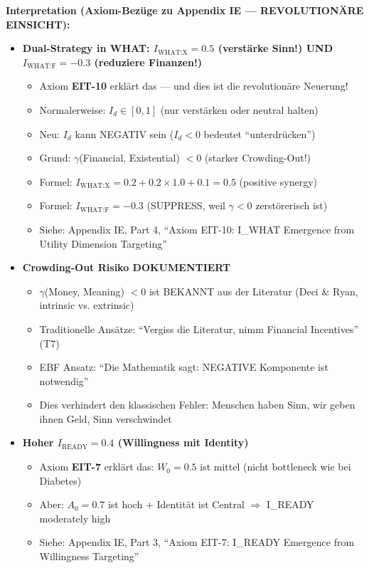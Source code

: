 \textbf{Interpretation (Axiom-Bezüge zu Appendix IE — REVOLUTIONÄRE EINSICHT):}
\begin{itemize}[nosep]
\item \textbf{Dual-Strategy in WHAT: $I_{\text{WHAT:X}} = 0.5$ (verstärke Sinn!) UND $I_{\text{WHAT:F}} = -0.3$ (reduziere Finanzen!)}
  \begin{itemize}[nosep]
  \item Axiom \textbf{EIT-10} erklärt das --- und dies ist die revolutionäre Neuerung!
  \item Normalerweise: $I_d \in [0, 1]$ (nur verstärken oder neutral halten)
  \item Neu: $I_d$ kann NEGATIV sein ($I_d < 0$ bedeutet ``unterdrücken'')
  \item Grund: $\gamma$(Financial, Existential) $< 0$ (starker Crowding-Out!)
  \item Formel: $I_{\text{WHAT:X}} = 0.2 + 0.2 \times 1.0 + 0.1 = 0.5$ (positive synergy)
  \item Formel: $I_{\text{WHAT:F}} = -0.3$ (SUPPRESS, weil $\gamma < 0$ zerstörerisch ist)
  \item Siehe: Appendix IE, Part 4, ``Axiom EIT-10: I_WHAT Emergence from Utility Dimension Targeting''
  \end{itemize}

\item \textbf{Crowding-Out Risiko DOKUMENTIERT}
  \begin{itemize}[nosep]
  \item $\gamma$(Money, Meaning) $< 0$ ist BEKANNT aus der Literatur (Deci \& Ryan, intrinsic vs. extrinsic)
  \item Traditionelle Ansätze: ``Vergiss die Literatur, nimm Financial Incentives'' (T7)
  \item EBF Ansatz: ``Die Mathematik sagt: NEGATIVE Komponente ist notwendig''
  \item Dies verhindert den klassischen Fehler: Menschen haben Sinn, wir geben ihnen Geld, Sinn verschwindet
  \end{itemize}

\item \textbf{Hoher $I_{\text{READY}} = 0.4$ (Willingness mit Identity)}
  \begin{itemize}[nosep]
  \item Axiom \textbf{EIT-7} erklärt das: $W_0 = 0.5$ ist mittel (nicht bottleneck wie bei Diabetes)
  \item Aber: $A_0 = 0.7$ ist hoch + Identität ist Central $\Rightarrow$ I_READY moderately high
  \item Siehe: Appendix IE, Part 3, ``Axiom EIT-7: I_READY Emergence from Willingness Targeting''
  \end{itemize}


\end{itemize}
